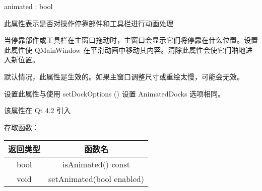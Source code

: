animated : bool

此属性表示是否对操作停靠部件和工具栏进行动画处理

当停靠部件或工具栏在主窗口拖动时，主窗口会显示它们将停靠在什么位置。设置此属性使 QMainWindow 在平滑动画中移动其内容。清除此属性会使它们啪地进入新位置。

默认情况，此属性是生效的。如果主窗口调整尺寸或重绘太慢，可能会无效。

设置此属性与使用 setDockOptions () 设置 AnimatedDocks 选项相同。

该属性在 Qt 4.2 引入

存取函数：

\begin{tabular}{|c|c|}
\hline
    返回类型 &	函数名 \\ 
\hline
bool	& isAnimated() const \\ 
\hline
void	& setAnimated(bool enabled) \\ 
\hline
\end{tabular}